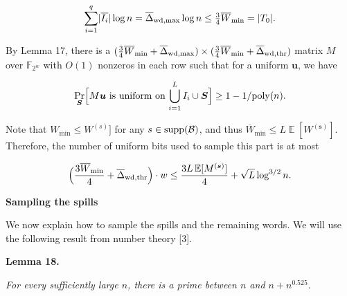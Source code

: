 \[\begin{gathered}
\sum_{i=1}^{q}\lvert\overline{I_{i}}\rvert\log n=\overline{\Delta}_{{\rm wd},\max}\log n\leq\tfrac{3}{4}\overline{W}_{\min}=\lvert T_{0}\rvert.
\end{gathered}\]




By Lemma 17, there is a $(\tfrac{3}{4}\overline{W}_{\min}+\overline{\Delta}_{{\rm wd},\max})\times(\tfrac{3}{4}\overline{W}_{\min}+\overline{\Delta}_{{\rm wd},{\rm thr}})$ matrix $M$ over $\mathbb{F}_{2^{w}}$ with $O(1)$ nonzeros in each row such that for a uniform $\boldsymbol{u}$, we have\par


\[\begin{gathered}
\Pr_{\boldsymbol{S}}\Bigl[\text{$M\boldsymbol{u}$ is uniform on $\bigcup_{i=1}^{L}I_{i}\cup\boldsymbol{S}$}\Bigr]\geq 1-1/\textnormal{poly}(n).
\end{gathered}\]




Note that $W_{\min}\leq W^{(s)}]$ for any $s\in{\rm supp}(\mathcal{B})$, and thus $\overline{W}_{\min}\leq L\operatorname{\mathbb{E}}[W^{(\boldsymbol{s})}]$.
Therefore, the number of uniform bits used to sample this part is at most\par


\[\begin{gathered}
\displaystyle\Bigl(\frac{3\overline{W}_{\min}}{4}+\overline{\Delta}_{{\rm wd},{\rm thr}}\Bigr)\cdot w\leq\frac{3L\operatorname{\mathbb{E}}[M^{(\boldsymbol{s})}]}{4}+\sqrt{L}\log^{3/2}n.
\end{gathered}\]





\par\medskip\noindent\textbf{Sampling the spills}\par




We now explain how to sample the spills and the remaining words.
We will use the following result from number theory [3].\par





\par\medskip\noindent\textbf{
\textbf{Lemma 18}\textbf{.}
}\par



\emph{For every sufficiently large $n$, there is a prime between $n$ and $n+n^{0.525}$.}\par



